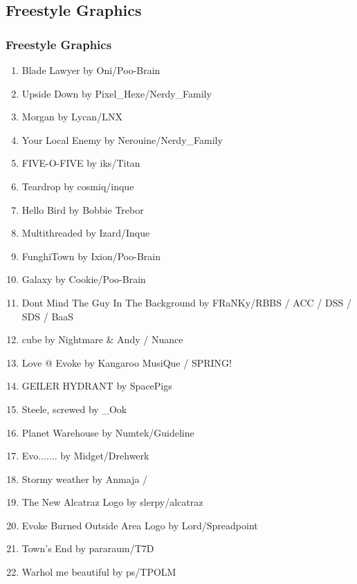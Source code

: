 \documentclass{beamer}
\begin{document}
\subsection{Freestyle Graphics}
\begin{frame}
  \frametitle{Freestyle Graphics}
  \begin{enumerate}
  \item Blade Lawyer by Oni/Poo-Brain
  \item Upside Down by Pixel\_Hexe/Nerdy\_Family
  \item Morgan by Lycan/LNX
  \item Your Local Enemy by Nerouine/Nerdy\_Family
  \item FIVE-O-FIVE by iks/Titan
  \item Teardrop by cosmiq/inque
  \item Hello Bird by Bobbie Trebor
  \item Multithreaded by Izard/Inque
  \item FunghiTown by Ixion/Poo-Brain
  \item Galaxy by Cookie/Poo-Brain
  \item Dont Mind The Guy In The Background by FRaNKy/RBBS / ACC / DSS / SDS / BaaS
  \end{enumerate}
\end{frame}
\begin{frame}
  \begin{enumerate}
    \setcounter{enumi}{11}
  \item cube by Nightmare \& Andy / Nuance
  \item Love @ Evoke by Kangaroo MusiQue / SPRING!
  \item GEILER HYDRANT by SpacePigs
  \item Steele, screwed by \_Ook
  \item Planet Warehouse by Numtek/Guideline
  \item Evo....... by Midget/Drehwerk
  \item Stormy weather  by Anmaja /
  \item The New Alcatraz Logo by slerpy/alcatraz
  \item Evoke Burned Outside Area Logo by Lord/Spreadpoint
  \item Town's End by pararaum/T7D
  \item Warhol me beautiful by ps/TPOLM
  \end{enumerate}
\end{frame}
\end{document}
